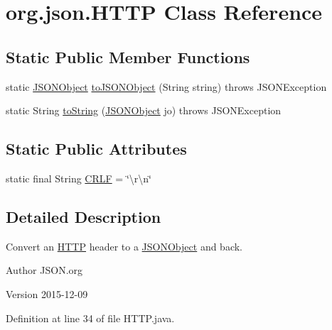 \hypertarget{classorg_1_1json_1_1HTTP}{\section{org.\-json.\-H\-T\-T\-P Class Reference}
\label{classorg_1_1json_1_1HTTP}
}
\subsection*{Static Public Member Functions}
\begin{DoxyCompactItemize}
\item 
static \hyperlink{classorg_1_1json_1_1JSONObject}{J\-S\-O\-N\-Object} \hyperlink{classorg_1_1json_1_1HTTP_a9ac2cf295e6a84bfeed1af10dc9dae33}{to\-J\-S\-O\-N\-Object} (String string)  throws J\-S\-O\-N\-Exception 
\item 
static String \hyperlink{classorg_1_1json_1_1HTTP_aee0416336b82e1c7c7941350a2a409d7}{to\-String} (\hyperlink{classorg_1_1json_1_1JSONObject}{J\-S\-O\-N\-Object} jo)  throws J\-S\-O\-N\-Exception 
\end{DoxyCompactItemize}
\subsection*{Static Public Attributes}
\begin{DoxyCompactItemize}
\item 
static final String \hyperlink{classorg_1_1json_1_1HTTP_a7feb3304ccde0415ee29b8f997fb65b6}{C\-R\-L\-F} = \char`\"{}\textbackslash{}r\textbackslash{}n\char`\"{}
\end{DoxyCompactItemize}


\subsection{Detailed Description}
Convert an \hyperlink{classorg_1_1json_1_1HTTP}{H\-T\-T\-P} header to a \hyperlink{classorg_1_1json_1_1JSONObject}{J\-S\-O\-N\-Object} and back. \begin{DoxyAuthor}{Author}
J\-S\-O\-N.\-org 
\end{DoxyAuthor}
\begin{DoxyVersion}{Version}
2015-\/12-\/09 
\end{DoxyVersion}


Definition at line 34 of file H\-T\-T\-P.\-java.



